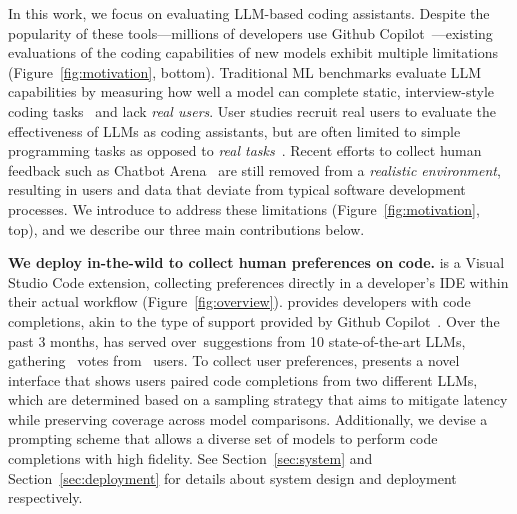  

In this work, we focus on evaluating LLM-based coding assistants. 
Despite the popularity of these tools---millions of developers use Github Copilot~\citep{Copilot}---existing
evaluations of the coding capabilities of new models exhibit multiple limitations (Figure~\ref{fig:motivation}, bottom).
Traditional ML benchmarks evaluate LLM capabilities by measuring how well a model can complete static, interview-style coding tasks~\citep{chen2021evaluating,austin2021program,jain2024livecodebench, white2024livebench} and lack \emph{real users}. 
User studies recruit real users to evaluate the effectiveness of LLMs as coding assistants, but are often limited to simple programming tasks as opposed to \emph{real tasks}~\citep{vaithilingam2022expectation,ross2023programmer, mozannar2024realhumaneval}.
Recent efforts to collect human feedback such as Chatbot Arena~\citep{chiang2024chatbot} are still removed from a \emph{realistic environment}, resulting in users and data that deviate from typical software development processes.
We introduce \systemName to address these limitations (Figure~\ref{fig:motivation}, top), and we describe our three main contributions below.


\textbf{We deploy \systemName in-the-wild to collect human preferences on code.} 
\systemName is a Visual Studio Code extension, collecting preferences directly in a developer's IDE within their actual workflow (Figure~\ref{fig:overview}).
\systemName provides developers with code completions, akin to the type of support provided by Github Copilot~\citep{Copilot}. 
Over the past 3 months, \systemName has served over~\completions suggestions from 10 state-of-the-art LLMs, 
gathering \sampleCount~votes from \userCount~users.
To collect user preferences,
\systemName presents a novel interface that shows users paired code completions from two different LLMs, which are determined based on a sampling strategy that aims to 
mitigate latency while preserving coverage across model comparisons.
Additionally, we devise a prompting scheme that allows a diverse set of models to perform code completions with high fidelity.
See Section~\ref{sec:system} and Section~\ref{sec:deployment} for details about system design and deployment respectively.



